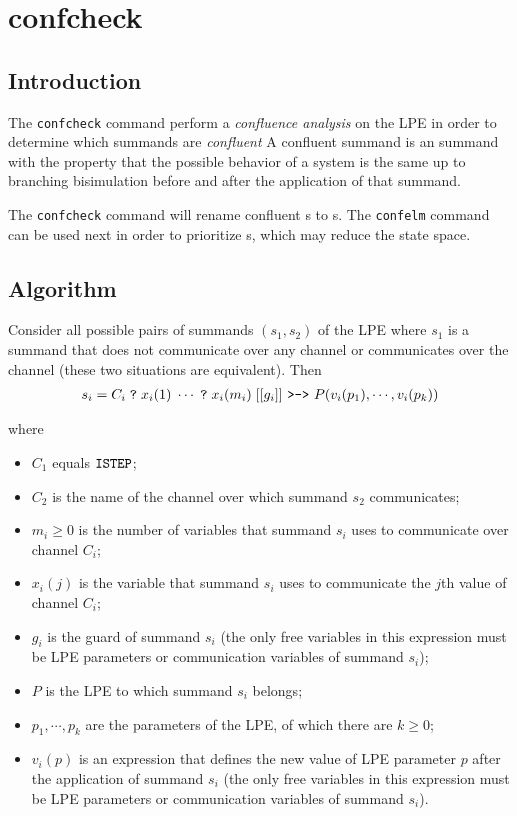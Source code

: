 \chapter{confcheck} \label{confcheck}

\section{Introduction}

The \texttt{confcheck} command perform a \emph{confluence analysis} on the LPE in order to determine which \istep{} summands are \emph{confluent}
A confluent \istep{} summand is an \istep{} summand with the property that the possible behavior of a system is the same up to branching bisimulation before and after the application of that summand.

The \texttt{confcheck} command will rename confluent \istep{}s to \cistep{}s.
The \texttt{confelm} command can be used next in order to prioritize \cistep{}s, which may reduce the state space.

\section{Algorithm}

Consider all possible pairs of summands $(s_1, s_2)$ of the LPE where $s_1$ is a summand that does not communicate over any channel or communicates over the channel \istep{} (these two situations are equivalent).
Then
\begin{align*}
s_i = C_i \; \texttt{?} \; x_i(1) \; \cdots{} \; \texttt{?} \; x_i(m_i) \; [[g_i]] \text{ \texttt{>->} } P(v_i(p_1), \cdots{}, v_i(p_k))
\end{align*}

where

\begin{itemize}
\item $C_1$ equals $\texttt{ISTEP}{}$;
\item $C_2$ is the name of the channel over which summand $s_2$ communicates;
\item $m_i \geq 0$ is the number of variables that summand $s_i$ uses to communicate over channel $C_i$;
\item $x_i(j)$ is the variable that summand $s_i$ uses to communicate the $j$th value of channel $C_i$;
\item $g_i$ is the guard of summand $s_i$ (the only free variables in this expression must be LPE parameters or communication variables of summand $s_i$);
\item $P$ is the LPE to which summand $s_i$ belongs;
\item $p_1, \cdots{}, p_k$ are the parameters of the LPE, of which there are $k \geq 0$;
\item $v_i(p)$ is an expression that defines the new value of LPE parameter $p$ after the application of summand $s_i$ (the only free variables in this expression must be LPE parameters or communication variables of summand $s_i$).
\end{itemize}

